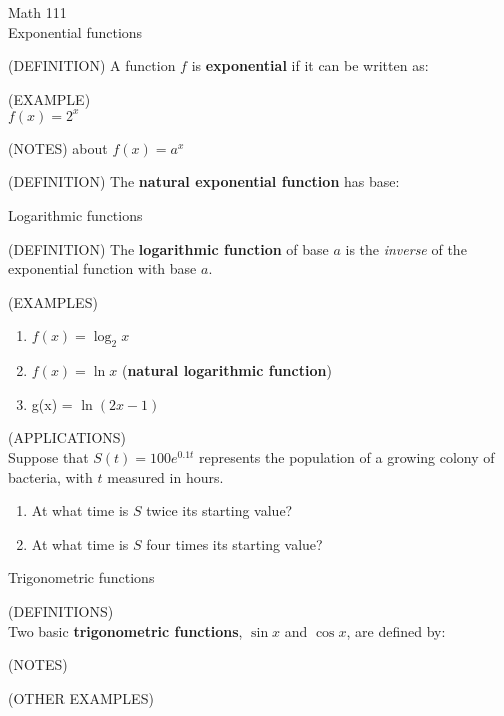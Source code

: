 \documentclass[11pt]{article}
\begin{document}
\begin{center}
\Large
\rm{Math 111}
\\
\rm{Exponential functions}
\\
\end{center}
\vspace{0.2in}

(DEFINITION)  A function $f$ is {\bf exponential} if it can be written as:

\vspace{0.5in}

(EXAMPLE) \\

$f(x) = 2^x$

\vspace{3.5in}

(NOTES) about $f(x) = a^x$

\vspace{2.0in}

(DEFINITION)  The {\bf natural exponential function} has base:

\pagebreak

\begin{center}
\Large
\rm{Logarithmic functions}
\end{center}

(DEFINITION)  The {\bf logarithmic function} of base $a$ is the \emph{inverse} of the exponential function with base $a$.

\vspace{2.5in}

(EXAMPLES) \\
\begin{enumerate}
\item{$f(x) = \log_2{x}$ 
}
  
\vspace{3.0in}

\item{$f(x) = \ln{x}$ \quad\quad ({\bf natural logarithmic function})
}
  \vspace{3.5in}
  
\item{g(x) = $\ln{(2x-1)}$

  \vspace{2.5in}

}
\end{enumerate}

  (APPLICATIONS) \\

  Suppose that $S(t) = 100e^{0.1t}$ represents the population of a growing colony of bacteria, with $t$ measured in hours.
  \begin{enumerate}
  \item{At what time is $S$ twice its starting value?}
  \item{At what time is $S$ four times its starting value?}
\end{enumerate}    

  \pagebreak
\begin{center}
\Large
\rm{Trigonometric functions}
\end{center}
(DEFINITIONS)\\

Two basic {\bf trigonometric functions}, $\sin{x}$ and $\cos{x}$, are defined by:

\vspace{3.5in}

(NOTES)


\vspace{2.5in}


(OTHER EXAMPLES)
\end{document}
